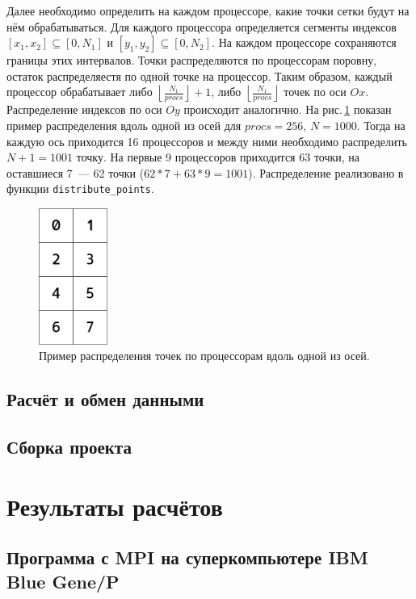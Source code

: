 \documentclass[11pt]{article}
\numberwithin{equation}{section}
\theoremstyle{plain}
\theoremstyle{definition}
\begin{document}
Далее необходимо определить на каждом процессоре, какие точки сетки будут на
нём обрабатываться. Для каждого процессора определяется сегменты индексов
$[x_1, x_2] \subseteq [0, N_1]$ и $[y_1, y_2] \subseteq [0, N_2]$.
На каждом процессоре сохраняются границы этих интервалов.
Точки распределяются по процессорам поровну, остаток распределяестя по
одной точке на процессор. Таким образом, каждый процессор
обрабатывает
либо $\left \lfloor \frac{N_1}{procs} \right \rfloor + 1$, либо
$\left \lfloor \frac{N_1}{procs} \right \rfloor$ точек по оси $Ox$.
Распределение индексов по оси $Oy$ происходит аналогично.
На рис.\,\ref{distr_points} показан пример распределения вдоль одной из
осей для $procs = 256$, $N = 1000$. Тогда на каждую ось приходится 16 процессоров
и между ними необходимо распределить $N + 1 = 1001$ точку. На первые 9
процессоров приходится 63 точки, на оставшиеся 7~--- 62 точки ($62*7 + 63*9 = 1001$).
Распределение реализовано в функции \verb|distribute_points|.

\begin{figure}[ht]
    \centering
    \includegraphics[width=0.2\textwidth]{proc_distr.png}
    \caption{Пример распределения точек по процессорам вдоль одной из осей.}
    \label{distr_points}
\end{figure}

\subsection{Расчёт и обмен данными}
\subsection{Сборка проекта}

\section{Результаты расчётов}
\subsection{Программа с MPI на суперкомпьютере IBM Blue Gene/P}
\end{document}
